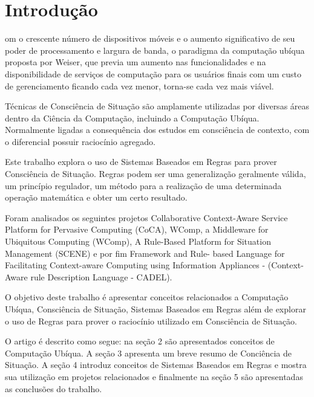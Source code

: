 \documentclass[12pt,a4paper,compsoc]{IEEEtran}
\begin{document}
\maketitle

\section{Introdução}

  om o crescente número de dispositivos móveis e o aumento significativo de seu
  poder de processamento e largura de banda, o paradigma da computação ubíqua proposta por Weiser,
  que previa um aumento nas funcionalidades e na disponibilidade de serviços de computação para os
  usuários finais com um custo de gerenciamento ficando cada vez menor, torna-se cada vez mais
  viável.
  
  Técnicas de Consciência de Situação são amplamente utilizadas por diversas áreas dentro da
  Ciência da Computação, incluindo a Computação Ubíqua. Normalmente ligadas a consequência dos
  estudos em consciência de contexto, com o diferencial possuir raciocínio agregado.
  
  Este trabalho explora o uso de Sistemas Baseados em Regras para prover Consciência de Situação.
  Regras podem ser uma generalização geralmente válida, um princípio regulador, um método para a
  realização de uma determinada operação matemática e obter um certo resultado.
  
  Foram analisados os seguintes projetos Collaborative Context-Aware Service Platform for Pervasive
  Computing (CoCA), WComp, a Middleware for Ubiquitous Computing (WComp), A Rule-Based Platform for
  Situation Management (SCENE) e por fim Framework and Rule- based Language for Facilitating 
  Context-aware Computing using Information Appliances - (Context-Aware rule Description Language -
  CADEL).
  
  O objetivo deste trabalho é apresentar conceitos relacionados a Computação Ubíqua, Consciência de
  Situação, Sistemas Baseados em Regras além de explorar o uso de Regras para prover o raciocínio
  utilizado em Consciência de Situação.
  
  O artigo é descrito como segue: na seção 2 são apresentados conceitos de Computação Ubíqua. A
  seção 3 apresenta um breve resumo de Conciência de Situação. A seção 4 introduz conceitos de
  Sistemas Baseados em Regras e mostra sua utilização em projetos relacionados e finalmente na
  seção 5 são apresentadas as conclusões do trabalho.
\end{document}
